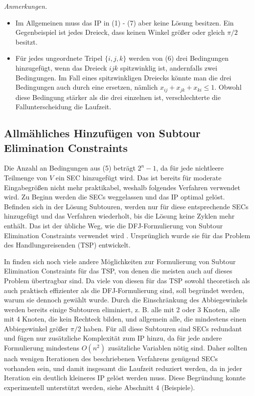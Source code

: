 \documentclass[a4paper, 10pt, ngerman]{article}
\begin{document}
\emph{Anmerkungen.} 
\begin{itemize}
    \item Im Allgemeinen muss das IP in (1) - (7) aber keine Lösung besitzen. Ein Gegenbeispiel ist jedes Dreieck, dass keinen Winkel größer oder gleich $\pi / 2$ besitzt.
    \item Für jedes ungeordnete Tripel $\{i, j, k\}$ werden von (6) drei Bedingungen hinzugefügt, wenn das Dreieck $ijk$ spitzwinklig ist, andernfalls zwei Bedingungen. Im Fall eines spitzwinkligen Dreiecks könnte man die drei Bedingungen auch durch eine ersetzen, nämlich $x_{ij} + x_{jk} + x_{ki} \le 1$. Obwohl diese Bedingung stärker als die drei einzelnen ist, verschlechterte die Fallunterscheidung die Laufzeit.
\end{itemize} 

\subsection{Allmähliches Hinzufügen von Subtour Elimination Constraints}

Die Anzahl an Bedingungen aus (5) beträgt $2^n - 1$, da für jede nichtleere Teilmenge von $V$ ein SEC hinzugefügt wird. Das ist bereits für moderate Eingabegrößen nicht mehr praktikabel, weshalb folgendes Verfahren verwendet wird. Zu Beginn werden die SECs weggelassen und das IP optimal gelöst. Befinden sich in der Lösung Subtouren, werden nur für diese entsprechende SECs hinzugefügt und das Verfahren wiederholt, bis die Lösung keine Zyklen mehr enthält. Das ist der übliche Weg, wie die DFJ-Formulierung von Subtour Elimination Constraints verwendet wird \cite{tsp-formulations}. Ursprünglich wurde sie für das Problem des Handlungsreisenden (TSP) entwickelt.

In \cite{tsp-formulations} finden sich noch viele andere Möglichkeiten zur Formulierung von Subtour Elimination Constraints für das TSP, von denen die meisten auch auf dieses Problem übertragbar sind. Da viele von diesen für das TSP sowohl theoretisch als auch praktisch effizienter als die DFJ-Formulierung sind, soll begründet werden, warum sie dennoch gewählt wurde. Durch die Einschränkung des Abbiegewinkels werden bereits einige Subtouren eliminiert, z. B. alle mit 2 oder 3 Knoten, alle mit 4 Knoten, die kein Rechteck bilden, und allgemein alle, die mindestens einen Abbiegewinkel größer $\pi / 2$ haben. Für all diese Subtouren sind SECs redundant und fügen nur zusätzliche Komplexität zum IP hinzu, da für jede andere Formulierung mindestens $O(n^2)$ zusätzliche Variablen nötig sind. Daher sollten nach wenigen Iterationen des beschriebenen Verfahrens genügend SECs vorhanden sein, und damit insgesamt die Laufzeit reduziert werden, da in jeder Iteration ein deutlich kleineres IP gelöst werden muss. Diese Begründung konnte experimentell unterstützt werden, siehe Abschnitt 4 (Beispiele).
\end{document}
